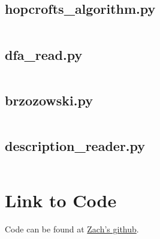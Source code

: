 \documentclass{article}
\begin{document}
\subsection{hopcrofts\_algorithm.py}
\label{code:hopcrofts}
\inputminted{python}{./hopcrofts_algorithm.py}

\subsection{dfa\_read.py}
\label{code:dfaRead}
\inputminted{python}{./dfa_read.py}

\subsection{brzozowski.py}
\label{code:brzo}
\inputminted{python}{./brzozowski.py}

\subsection{description\_reader.py}
\label{code:descriptionReader}
\inputminted{python}{./description_reader.py}

\section*{Link to Code}
Code can be found at \href{https://github.com/zinfidel/cs554-project1}{Zach's github}.
\end{document}
